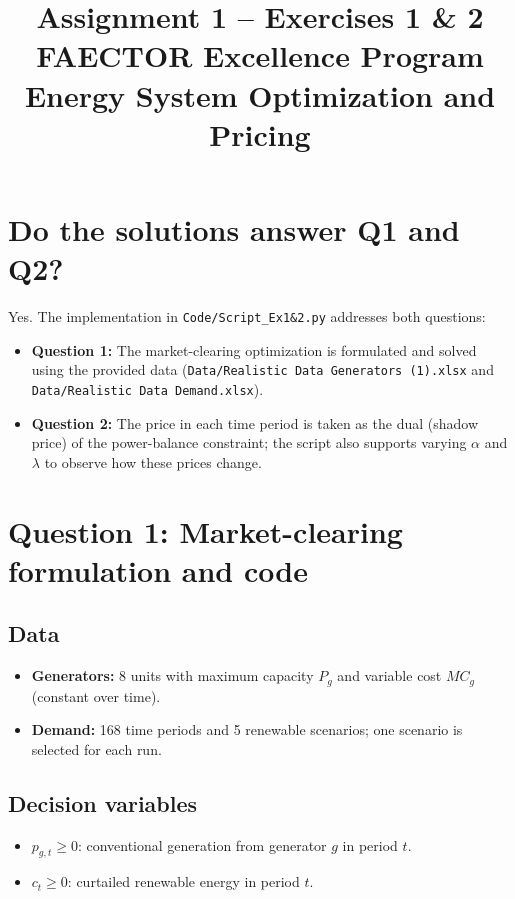 \documentclass[11pt,a4paper]{article}
\title{Assignment 1 -- Exercises 1 \& 2\\\large FAECTOR Excellence Program\\Energy System Optimization and Pricing}
\author{}
\date{}
\begin{document}
\maketitle

\section*{Do the solutions answer Q1 and Q2?}

Yes. The implementation in \texttt{Code/Script\_Ex1\&2.py} addresses both questions:
\begin{itemize}
  \item \textbf{Question 1:} The market-clearing optimization is formulated and solved using the provided data (\texttt{Data/Realistic Data Generators (1).xlsx} and \texttt{Data/Realistic Data Demand.xlsx}).
  \item \textbf{Question 2:} The price in each time period is taken as the dual (shadow price) of the power-balance constraint; the script also supports varying $\alpha$ and $\lambda$ to observe how these prices change.
\end{itemize}

\section{Question 1: Market-clearing formulation and code}

\subsection{Data}
\begin{itemize}
  \item \textbf{Generators:} 8 units with maximum capacity $P_g$ and variable cost $MC_g$ (constant over time).
  \item \textbf{Demand:} 168 time periods and 5 renewable scenarios; one scenario is selected for each run.
\end{itemize}

\subsection{Decision variables}
\begin{itemize}
  \item $p_{g,t} \geq 0$: conventional generation from generator $g$ in period $t$.
  \item $c_t \geq 0$: curtailed renewable energy in period $t$.
\end{itemize}
\end{document}

